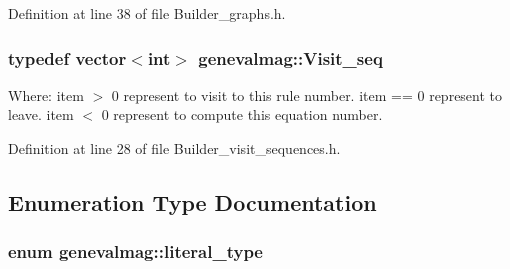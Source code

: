 Definition at line 38 of file Builder\_\-graphs.h.\hypertarget{namespacegenevalmag_7720677d79b33ecca4db21cdbcf7908f}{
\subsubsection[{Visit\_\-seq}]{\setlength{\rightskip}{0pt plus 5cm}typedef vector$<$int$>$ {\bf genevalmag::Visit\_\-seq}}}
\label{namespacegenevalmag_7720677d79b33ecca4db21cdbcf7908f}


Where: item $>$ 0 represent to visit to this rule number. item == 0 represent to leave. item $<$ 0 represent to compute this equation number. 

Definition at line 28 of file Builder\_\-visit\_\-sequences.h.

\subsection{Enumeration Type Documentation}
\hypertarget{namespacegenevalmag_054e5e9167597919bb2fe12ba999fb31}{
\subsubsection[{literal\_\-type}]{\setlength{\rightskip}{0pt plus 5cm}enum {\bf genevalmag::literal\_\-type}}}
\label{namespacegenevalmag_054e5e9167597919bb2fe12ba999fb31}


